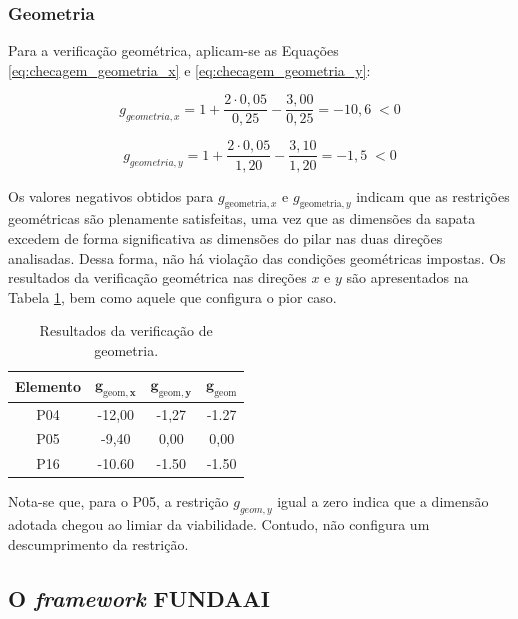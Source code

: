 \subsubsection{Geometria}
\label{subsec:geometria_s16}

Para a verificação geométrica, aplicam-se as Equações \eqref{eq:checagem_geometria_x} e \eqref{eq:checagem_geometria_y}:

\begin{equation}
g_{geometria,x} = 1 + \frac{2 \cdot 0,05 }{0,25} -  \frac{3,00}{0,25} =  -10,6 \; <0
    \label{eq:el16_checagem_geometria_x}
\end{equation}

\begin{equation}
g_{geometria,y} = 1 + \frac{2 \cdot 0,05 }{1,20} -  \frac{3,10}{1,20}  = -1,5 \; < 0
    \label{eq:el16_checagem_geometria_y}
\end{equation}

Os valores negativos obtidos para \(g_{\text{geometria},x}\) e \(g_{\text{geometria},y}\) indicam que as restrições geométricas são plenamente satisfeitas, uma vez que as dimensões da sapata excedem de forma significativa as dimensões do pilar nas duas direções analisadas. Dessa forma, não há violação das condições geométricas impostas. Os resultados da verificação geométrica nas direções $x$ e $y$ são apresentados na Tabela \ref{tab:geometria_s16}, bem como aquele que configura o pior caso.


\begin{table}[H]
\caption{Resultados da verificação de geometria.}
\label{tab:geometria_s16}
\centering
\begin{tabular}{cccc}
\toprule
\textbf{Elemento} &
$\mathbf{g_{\mathrm{geom},x}}$ & $\mathbf{g_{\mathrm{geom},y}}$ & $\mathbf{g_{\mathrm{geom}}}$ \\
\midrule
 P04 & -12,00 & -1,27 & -1.27 \\
 P05 & -9,40  & 0,00  & 0,00  \\
 P16 & -10.60 & -1.50 & -1.50 \\
\bottomrule
\end{tabular}
\end{table}

Nota-se que, para o P05, a restrição $g_{geom,y}$ igual a zero indica que a dimensão adotada chegou ao limiar da viabilidade. Contudo, não configura um descumprimento da restrição.

\subsection{O \textit{framework }FUNDAAI}

